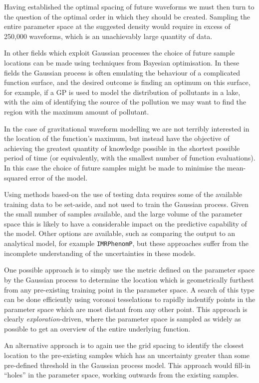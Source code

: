 \documentclass[openleft]{kentigern}
\theoremstyle{definition}
\begin{document}
Having established the optimal spacing of future waveforms we must
then turn to the question of the optimal order in which they should be
created. Sampling the entire parameter space at the suggested density
would require in excess of 250,000 waveforms, which is an unachievably
large quantity of data.

In other fields which exploit Gaussian processes the choice of future
sample locations can be made using techniques from Bayesian
optimisation. In these fields the Gaussian process is often emulating
the behaviour of a complicated function surface, and the desired
outcome is finding an optimum on this surface, for example, if a GP is
used to model the distribution of pollutants in a lake, with the aim
of identifying the source of the pollution we may want to find the
region with the maximum amount of pollutant. 

In the case of gravitational waveform modelling we are not terribly
interested in the location of the function's maximum, but instead have
the objective of achieving the greatest quantity of knowledge possible
in the shortest possible period of time (or equivalently, with the
smallest number of function evaluations). In this case the choice of
future samples might be made to minimise the mean-squared error of the
model.

Using methods based-on the use of testing data requires some of the
available training data to be set-aside, and not used to train the
Gaussian process. Given the small number of samples available, and the
large volume of the parameter space this is likely to have a
considerable impact on the predictive capability of the model. Other
options are available, such as comparing the output to an analytical
model, for example \texttt{IMRPhenomP}, but these approaches suffer
from the incomplete understanding of the uncertainties in these
models.

One possible approach is to simply use the metric defined on the
parameter space by the Gaussian process to determine the location
which is geometrically furthest from any pre-existing training point
in the parameter space. A search of this type can be done efficiently
using voronoi tesselations to rapidly indentify points in the
parameter space which are most distant from any other point. This
approach is clearly \emph{exploration}-driven, where the parameter
space is sampled as widely as possible to get an overview of the
entire underlying function.

An alternative approach is to again use the grid spacing to identify
the closest location to the pre-existing samples which has an
uncertainty greater than some pre-defined threshold in the Gaussian
process model. This approach would fill-in ``holes'' in the parameter
space, working outwards from the existing samples.
\end{document}
